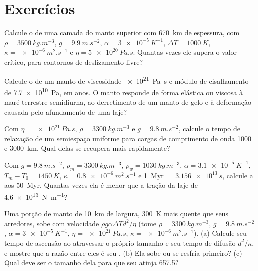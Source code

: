 \section*{Exercícios}

\begin{exercise}[$\star$]\label{exo:b3:mantle-convection:1}
Calcule o  de uma camada do manto superior com \qty{670}{km} de espessura, com
$\rho = \qty{3500}{kg.m^{-3}}$, $g = \qty{9.9}{m.s^{-2}}$, $\alpha =
\qty{3e-5}{K^{-1}}$, $\Delta T = \qty{1000}{K}$, $\kappa =
\qty{e-6}{m^2.s^{-1}}$ e $\eta = \qty{5e20}{Pa.s}$. Quantas vezes ele supera
o valor crítico, para contornos de deslizamento livre?
\end{exercise}

\begin{exercise}[$\star$]\label{exo:b3:mantle-convection:2}
Calcule o  de um manto de viscosidade \qty{e21}{Pa.s} e módulo de cisalhamento
de \qty{7.7e10}{Pa}, em anos. O manto responde de forma elástica ou
viscosa à maré terrestre semidiurna, ao derretimento de um manto de gelo e à
deformação causada pelo afundamento de uma laje?
\end{exercise}

\begin{exercise}[$\star$]\label{exo:b3:mantle-convection:3}
Com $\eta = \qty{e21}{Pa.s}$, $\rho = \qty{3300}{kg.m^{-3}}$ e $g =
\qty{9.8}{m.s^{-2}}$, calcule o tempo de relaxação de um semiespaço uniforme para
cargas de comprimento de onda 1000 e \qty{3000}{km}. Qual delas se recupera mais rapidamente?
\end{exercise}

\begin{exercise}[$\star$]\label{exo:b3:mantle-convection:4}
Com $g = \qty{9.8}{m.s^{-2}}$, $\rho_m = \qty{3300}{kg.m^{-3}}$, $\rho_w =
\qty{1030}{kg.m^{-3}}$, $\alpha = \qty{3.1e-5}{K^{-1}}$, $T_m - T_0 =
\qty{1450}{K}$, $\kappa = \qty{0.8e-6}{m^2.s^{-1}}$ e \qty{1}{Myr} $=
\qty{3.156e13}{s}$, calcule a  aos \qty{50}{Myr}. Quantas vezes
ela é menor que a tração da laje de \qty{4.6e13}{N.m^{-1}}?
\end{exercise}

\begin{exercise}[$\star\star$]\label{exo:b3:mantle-convection:5}
Uma porção de manto de \qty{10}{km} de largura, \qty{300}{K} mais quente que seus
arredores, sobe com velocidade $\rho g\alpha\Delta Td^2/\eta$ (tome $\rho =
\qty{3300}{kg.m^{-3}}$, $g = \qty{9.8}{m.s^{-2}}$, $\alpha = \qty{3e-5}{K^{-1}}$,
$\eta = \qty{e21}{Pa.s}$, $\kappa = \qty{e-6}{m^2.s^{-1}}$). (a) Calcule seu
tempo de ascensão ao atravessar o próprio tamanho e seu tempo de difusão $d^2/\kappa$, e mostre
que a razão entre eles é seu . (b) Ela sobe ou se resfria primeiro? (c)
Qual deve ser o tamanho dela para que seu  atinja 657.5?
\end{exercise}

